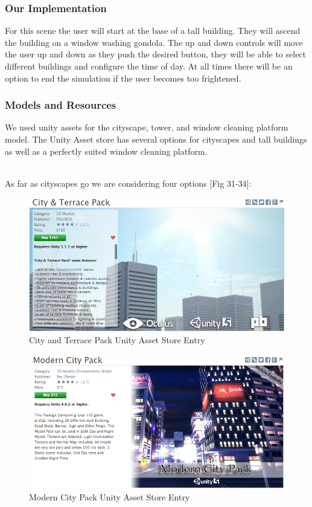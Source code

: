 \documentclass[a4paper,10pt]{article}
\begin{document}
\subsubsection{Our Implementation}
For this scene the user will start at the base of a tall building. They will ascend the building on a window washing gondola. The up and down controls will move the user up and down as they push the desired button, they will be able to select different buildings and configure the time of day. At all times there will be an option to end the simulation if the user becomes too frightened.

\subsubsection{Models and Resources}
We used unity assets for the cityscape, tower, and window cleaning platform model. The Unity Asset store has several options for cityscapes and tall buildings as well as a perfectly suited window cleaning platform.
\par~\\ 
As far as cityscapes go we are considering four options [Fig 31-34]:
\begin{figure}[H] %
	\centerline {\includegraphics[scale = 0.50]{cityAndTerracePack.png}}
	\caption{City and Terrace Pack Unity Asset Store Entry}
	\label{fig:cityAndTerracePack}
\end{figure}
\begin{figure}[H] %
	\centerline {\includegraphics[scale = 0.50]{modernCityPack.png}}
	\caption{Modern City Pack Unity Asset Store Entry}
	\label{fig:modernCityPack}
\end{figure}
\end{document}
